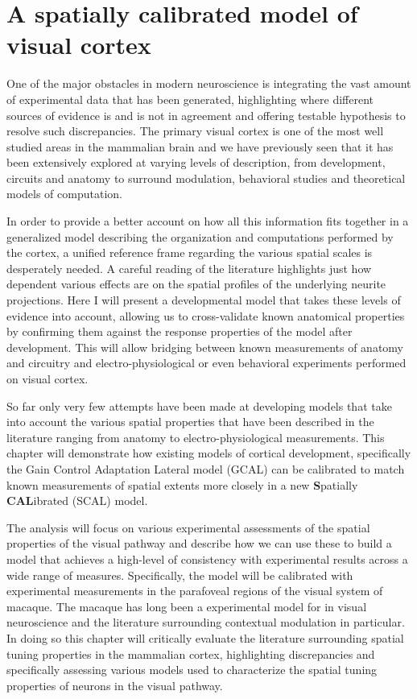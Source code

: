 \chapter{A spatially calibrated model of visual cortex}
\label{SCALmodel}

One of the major obstacles in modern neuroscience is integrating the
vast amount of experimental data that has been generated, highlighting
where different sources of evidence is and is not in agreement and
offering testable hypothesis to resolve such discrepancies. The
primary visual cortex is one of the most well studied areas in the
mammalian brain and we have previously seen that it has been
extensively explored at varying levels of description, from
development, circuits and anatomy to surround modulation, behavioral
studies and theoretical models of computation.

In order to provide a better account on how all this information fits
together in a generalized model describing the organization and
computations performed by the cortex, a unified reference frame
regarding the various spatial scales is desperately needed. A careful
reading of the literature highlights just how dependent various
effects are on the spatial profiles of the underlying neurite
projections. Here I will present a developmental model that takes
these levels of evidence into account, allowing us to cross-validate
known anatomical properties by confirming them against the response
properties of the model after development. This will allow bridging
between known measurements of anatomy and circuitry and
electro-physiological or even behavioral experiments performed on
visual cortex.

So far only very few attempts have been made at developing models that
take into account the various spatial properties that have been
described in the literature ranging from anatomy to
electro-physiological measurements. This chapter will demonstrate how
existing models of cortical development, specifically the Gain Control
Adaptation Lateral model (GCAL) \citep{Stevens2013} can be calibrated
to match known measurements of spatial extents more closely in a new
\textbf{S}patially \textbf{CAL}ibrated (SCAL) model.

The analysis will focus on various experimental assessments of the
spatial properties of the visual pathway and describe how we can use
these to build a model that achieves a high-level of consistency with
experimental results across a wide range of measures. Specifically,
the model will be calibrated with experimental measurements in the
parafoveal regions of the visual system of macaque. The macaque has
long been a experimental model for in visual neuroscience and the
literature surrounding contextual modulation in particular. In doing
so this chapter will critically evaluate the literature surrounding
spatial tuning properties in the mammalian cortex, highlighting
discrepancies and specifically assessing various models used to
characterize the spatial tuning properties of neurons in the visual
pathway.

